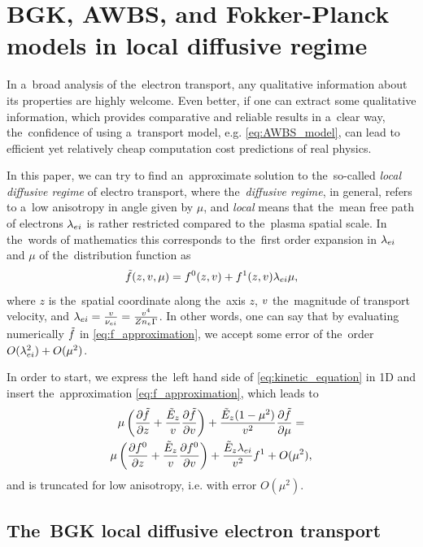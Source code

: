 \section{BGK, AWBS, and Fokker-Planck models in local diffusive regime}
\label{sec:DiffusiveKinetics}

In a~broad analysis of the~electron transport, any qualitative information
about its properties are highly welcome. Even better, if one can extract some 
qualitative information, which provides comparative and reliable results in 
a~clear way, the~confidence of using a~transport model, 
e.g. \eqref{eq:AWBS_model}, can lead to efficient yet relatively
cheap computation cost predictions of real physics.

In this paper, we can try to find an~approximate solution to the~so-called
\textit{local diffusive regime} of electro transport, 
where the~\textit{diffusive regime}, in general, refers to a~low anisotropy 
in angle given by $\mu$, and \textit{local} means that the~mean free path of 
electrons $\lambda_{ei}$ is rather restricted compared to the~plasma spatial scale. 
In the~words of mathematics this corresponds to the~first 
order expansion in $\lambda_{ei}$ and $\mu$ of the~distribution function as
\begin{equation}
  \tilde{f}(z, v, \mu) = f^0(z, v) + f^1(z, v) \lambda_{ei}\mu ,
  \label{eq:f_approximation}
\end{equation}
where $z$ is the~spatial coordinate along the~axis $z$, $v$ the~magnitude 
of transport velocity, and 
$\lambda_{ei} = \frac{v}{\nu_{ei}} = \frac{v^4}{Z n_e \Gamma}$.
In other words, one can say that by evaluating numerically $\tilde{f}$
in \eqref{eq:f_approximation}, we accept some error of the~order 
$O(\lambda_{ei}^2) + O(\mu^2)$.

In order to start, we express the~left hand side of \eqref{eq:kinetic_equation}
in 1D and insert the~approximation \eqref{eq:f_approximation}, which leads to
\begin{multline}
  \mu\left(\frac{\partial{\tilde{f}}}{\partial{z}} + \frac{\tilde{E}_z}{v}\frac{\partial{\tilde{f}}}{\partial{v}}\right) 
  + \frac{\tilde{E}_z(1-\mu^2)}{v^2}\frac{\partial{\tilde{f}}}{\partial{\mu}} = \\
  \mu\left(\frac{\partial{f^0}}{\partial{z}} + \frac{\tilde{E}_z}{v}\frac{\partial{f^0}}{\partial{v}}\right) 
  + \frac{\tilde{E}_z\lambda_{ei}}{v^2} f^1 + O(\mu^2) ,
  \label{eq:LHS_kinetic_equation}
\end{multline}
and is truncated for low anisotropy, i.e. with error $O(\mu^2)$.

\subsection{The~BGK local diffusive electron transport}
\label{sec:BGKDiffusiveRegime}

